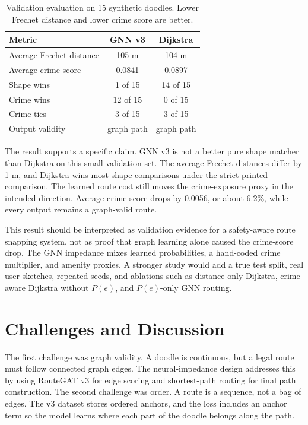 \documentclass{article}
\begin{document}
\begin{table}[H]
  \centering
  \caption{Validation evaluation on 15 synthetic doodles. Lower Frechet distance and lower crime score are better.}
  \label{tab:results}
  \small
  \begin{tabular}{lcc}
    \toprule
    Metric & GNN v3 & Dijkstra \\
    \midrule
    Average Frechet distance & 105 m & 104 m \\
    Average crime score & 0.0841 & 0.0897 \\
    Shape wins & 1 of 15 & 14 of 15 \\
    Crime wins & 12 of 15 & 0 of 15 \\
    Crime ties & 3 of 15 & 3 of 15 \\
    Output validity & graph path & graph path \\
    \bottomrule
  \end{tabular}
\end{table}

The result supports a specific claim. GNN v3 is not a better pure shape matcher than Dijkstra on this small validation set. The average Frechet distances differ by 1 m, and Dijkstra wins most shape comparisons under the strict printed comparison. The learned route cost still moves the crime-exposure proxy in the intended direction. Average crime score drops by 0.0056, or about 6.2\%, while every output remains a graph-valid route.

This result should be interpreted as validation evidence for a safety-aware route snapping system, not as proof that graph learning alone caused the crime-score drop. The GNN impedance mixes learned probabilities, a hand-coded crime multiplier, and amenity proxies. A stronger study would add a true test split, real user sketches, repeated seeds, and ablations such as distance-only Dijkstra, crime-aware Dijkstra without \(P(e)\), and \(P(e)\)-only GNN routing.

\section{Challenges and Discussion}

The first challenge was graph validity. A doodle is continuous, but a legal route must follow connected graph edges. The neural-impedance design addresses this by using RouteGAT v3 for edge scoring and shortest-path routing for final path construction. The second challenge was order. A route is a sequence, not a bag of edges. The v3 dataset stores ordered anchors, and the loss includes an anchor term so the model learns where each part of the doodle belongs along the path.
\end{document}
